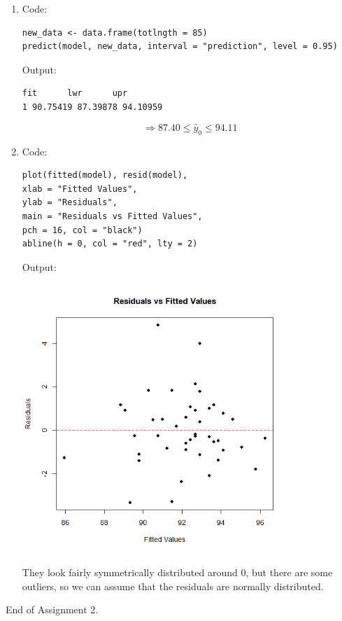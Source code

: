 \documentclass[12pt]{article}
\begin{document}
\begin{enumerate}[1.]
\begin{enumerate}
\begin{verbatim}
# conclusion
if (F_statistic > F_critical) {
    cat("Reject the null hypothesis:
There is a significant relationship
between hdlngth and totlngth.\n")
} else {
    cat("Fail to reject the null hypothesis: 
There is no significant relationship
between hdlngth and totlngth.\n")
}
                \end{verbatim}
                Output:
                \begin{verbatim}
Calculated F-statistic: 63.38 
Critical F-value (two-tailed): 4.078546 
Reject the null hypothesis:
There is a significant relationship
between hdlngth and totlngth.
                \end{verbatim}
                \item Code: \begin{verbatim}
new_data <- data.frame(totlngth = 85)
predict(model, new_data, interval = "prediction", level = 0.95)
                \end{verbatim}
                Output:
                \begin{verbatim}
fit      lwr      upr
1 90.75419 87.39878 94.10959
                \end{verbatim}
                \[ \Rightarrow 87.40 \leq \hat{y}_0 \leq 94.11 \]
                \item Code: \begin{verbatim}
plot(fitted(model), resid(model), 
xlab = "Fitted Values", 
ylab = "Residuals", 
main = "Residuals vs Fitted Values",
pch = 16, col = "black")
abline(h = 0, col = "red", lty = 2)
                \end{verbatim}
                Output:
                \begin{center}
                    \includegraphics[width=0.8\textwidth]{Rplot041.png}
                \end{center}
                They look fairly symmetrically distributed around 0, but there are some outliers, so 
                we can assume that the residuals are normally distributed.
            \end{enumerate}
\end{enumerate}
End of Assignment 2.
\end{document}

